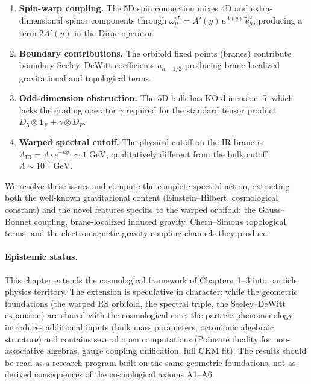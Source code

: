\begin{enumerate}
  \item \textbf{Spin-warp coupling.} The 5D spin connection mixes 4D and extra-dimensional spinor components through $\omega^{a5}_\mu = A'(y)\, e^{A(y)}\, \tilde{e}^a_\mu$, producing a term $2A'(y)$ in the Dirac operator.

  \item \textbf{Boundary contributions.} The orbifold fixed points (branes) contribute boundary Seeley--DeWitt coefficients $a_{n+1/2}$ producing brane-localized gravitational and topological terms.

  \item \textbf{Odd-dimension obstruction.} The 5D bulk has KO-dimension~5, which lacks the grading operator $\gamma$ required for the standard tensor product $D_5 \otimes \mathbf{1}_F + \gamma \otimes D_F$.

  \item \textbf{Warped spectral cutoff.} The physical cutoff on the IR brane is $\Lambda_{\mathrm{IR}} = \Lambda \cdot e^{-ky_c} \sim 1\;\mathrm{GeV}$, qualitatively different from the bulk cutoff $\Lambda \sim 10^{17}\;\mathrm{GeV}$.
\end{enumerate}

We resolve these issues and compute the complete spectral action, extracting both the well-known gravitational content (Einstein--Hilbert, cosmological constant) and the novel features specific to the warped orbifold: the Gauss--Bonnet coupling, brane-localized induced gravity, Chern--Simons topological terms, and the electromagnetic-gravity coupling channels they produce.

\paragraph{Epistemic status.}
This chapter extends the cosmological framework of Chapters~1--3 into particle physics territory. The extension is speculative in character: while the geometric foundations (the warped RS orbifold, the spectral triple, the Seeley--DeWitt expansion) are shared with the cosmological core, the particle phenomenology introduces additional inputs (bulk mass parameters, octonionic algebraic structure) and contains several open computations (Poincar\'{e} duality for non-associative algebras, gauge coupling unification, full CKM fit). The results should be read as a research program built on the same geometric foundations, not as derived consequences of the cosmological axioms A1--A6.

